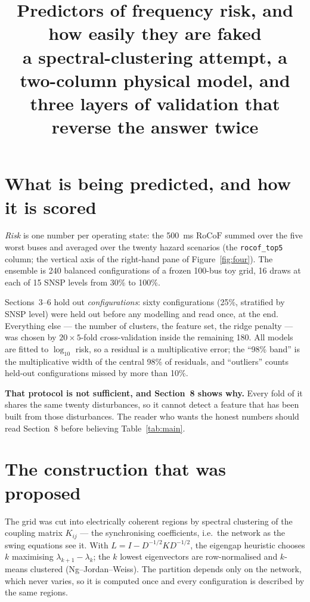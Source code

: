 \documentclass[11pt,a4paper]{article}
\title{\textbf{Predictors of frequency risk, and how easily they are
faked}\\[2pt]
\large a spectral-clustering attempt, a two-column physical model,
and three layers of validation that reverse the answer twice}
\author{}
\date{}
\newcommand{\rocof}{\ensuremath{\mathrm{RoCoF}}}
\begin{document}
\maketitle
\vspace{-2.2\baselineskip}

\section{What is being predicted, and how it is scored}

\emph{Risk} is one number per operating state: the \SI{500}{\milli\second}
\rocof{} summed over the five worst buses and averaged over the twenty
hazard scenarios (the \texttt{rocof\_top5} column; the vertical axis of the
right-hand pane of Figure~\ref{fig:four}). The ensemble is 240 balanced
configurations of a frozen 100-bus toy grid, 16 draws at each of 15 SNSP
levels from 30\% to 100\%.

Sections~3--6 hold out \emph{configurations}: sixty configurations
(25\%, stratified by SNSP level) were held out before any modelling and read
once, at the end. Everything else --- the number of clusters, the feature
set, the ridge penalty --- was chosen by $20\times5$-fold cross-validation
inside the remaining 180. All models are fitted to $\log_{10}$ risk, so a
residual is a multiplicative error; the ``98\% band'' is the multiplicative
width of the central 98\% of residuals, and ``outliers'' counts held-out
configurations missed by more than 10\%.

\textbf{That protocol is not sufficient, and Section~8 shows why.} Every fold
of it shares the same twenty disturbances, so it cannot detect a feature that
has been built from those disturbances. The reader who wants the honest
numbers should read Section~8 before believing Table~\ref{tab:main}.

\section{The construction that was proposed}

The grid was cut into electrically coherent regions by spectral clustering
of the coupling matrix $K_{ij}$ --- the synchronising coefficients, i.e.\ the
network as the swing equations see it. With $L = I - D^{-1/2} K D^{-1/2}$,
the eigengap heuristic chooses $k$ maximising $\lambda_{k+1}-\lambda_k$; the
$k$ lowest eigenvectors are row-normalised and $k$-means clustered
(Ng--Jordan--Weiss). The partition depends only on the network, which never
varies, so it is computed once and every configuration is described by the
same regions.
\end{document}
